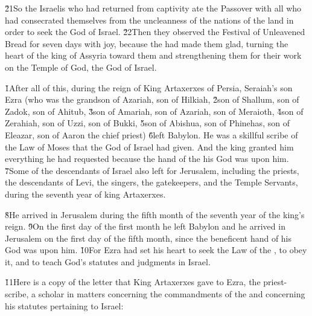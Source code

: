 \v{21}So the Israelis who had returned from captivity ate the Passover with all who had consecrated themselves from the uncleanness of the nations of the land in order to seek the  God of Israel. \v{22}Then they observed the Festival of Unleavened Bread for seven days with joy, because the  had made them glad, turning the heart of the king of Assyria toward them and strengthening them for their work on the Temple of God, the God of Israel.

\v{1}After all of this, during the reign of King Artaxerxes of Persia, Seraiah's son Ezra (who was the grandson of Azariah, son of Hilkiah, \v{2}son of Shallum, son of Zadok, son of Ahitub, \v{3}son of Amariah, son of Azariah, son of Meraioth, \v{4}son of Zerahiah, son of Uzzi, son of Bukki, \v{5}son of Abishua, son of Phinehas, son of Eleazar, son of Aaron the chief priest) \v{6}left Babylon. He was a skillful scribe of the Law of Moses that the  God of Israel had given. And the king granted him everything he had requested because the hand of the  his God was upon him. \v{7}Some of the descendants of Israel also left for Jerusalem, including the priests, the descendants of Levi, the singers, the gatekeepers, and the Temple Servants, during the seventh year of king Artaxerxes.

\v{8}He arrived in Jerusalem during the fifth month of the seventh year of the king's reign. \v{9}On the first day of the first month he left Babylon and he arrived in Jerusalem on the first day of the fifth month, since the beneficent hand of his God was upon him. \v{10}For Ezra had set his heart to seek the Law of the , to obey it, and to teach God's statutes and judgments in Israel.

\v{11}Here is a copy of the letter that King Artaxerxes gave to Ezra, the priest-scribe, a scholar in matters concerning the commandments of the  and concerning his statutes pertaining to Israel:

